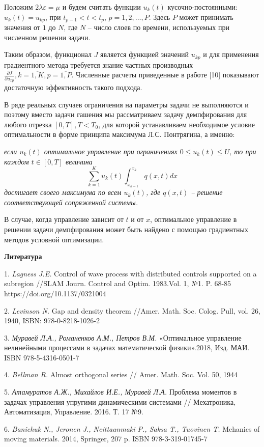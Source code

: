 Положим $2\lambda\varepsilon=\mu$ и будем считать функции $u_k(t)$ кусочно-постоянными: $u_k(t)=u_{kp}$, при $t_{p-1}<t<t_p$, $p=1,2,\dots,P$. Здесь $P$ может принимать значения от $1$ до $N$, где $N$ -- число слоев по времени, используемых при численном решении задачи.

Таким образом, функционал $J$ является функцией значений $u_{kp}$ и для применения градиентного метода требуется знание частных производных $\frac{\partial J}{\partial u_{xp}}, k=\overline{1,K}, p=\overline{1,P}.$ Численные расчеты приведенные в работе [10] показывают достаточную эффективность такого подхода.

В ряде реальных случаев ограничения на параметры задачи не выполняются и поэтому вместо задачи гашения мы рассматриваем задачу демпфирования для любого отрезка $[0,T], T<T_0$, для которой устанавливаем необходимое условие оптимальности в форме принципа максимума Л.С. Понтрягина, а именно:

 {\it если $u_k(t)$ оптимальное управление при ограничениях
	$0\leq u_k(t)\leq U$, то при каждом $t\in[0,T]$ величина
	$$\sum_{k=1}^{K}u_k(t)\int_{x_{k-1}}^{x_k}q\left(x,t\right)dx$$
	достигает своего максимума по всем $u_k(t)$, где $q(x,t)$ -- решение соответствующей сопряженной системы. 
}

В случае, когда управление зависит от $t$ и от $x$, оптимальное управление в решении задачи демпфирования может быть найдено с помощью градиентных методов условной оптимизации.

\smallskip \centerline {\bf Литература} \nopagebreak

1. {\it Lagness J.E.} Control of wave process with distributed controls supported on a subregion //SLAM Journ. Control and Optim. 1983.Vol. 1, №1. P. 68-85 https://doi.org/10.1137/0321004

2. {\it Levinson N.} Gap and density theorem //Amer. Math. Soc. Colog. Pull, vol. 26, 1940, ISBN: 978-0-8218-1026-2

3. {\it Муравей Л.А., Романенков А.М., Петров В.М.} «Оптимальное управление нелинейными процессами в задачах математической физики».2018, Изд. МАИ. ISBN 978-5-4316-0501-7 

4. {\it Bellman R.} Almost orthogonal series // Amer. Math. Soc. Vol. 50, 1944

5.  {\it Атамуратов А.Ж., Михайлов И.Е., Муравей Л.А.} Проблема моментов в задачах управления упругими динамическими системами // Мехатроника, Автоматизация, Управление. 2016. Т. 17 №9.

6. {\it Banichuk N., Jeronen J., Neittaanmaki P., Saksa T., Tuovinen T.} Mehanics of moving materials. 2014, Springer, 207 p. ISBN 978-3-319-01745-7

